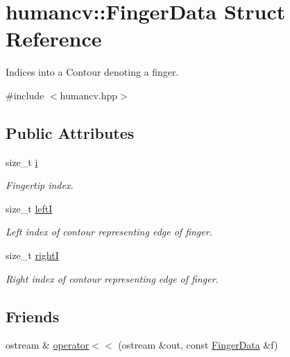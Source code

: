 \hypertarget{structhumancv_1_1_finger_data}{\section{humancv\-:\-:Finger\-Data Struct Reference}
\label{structhumancv_1_1_finger_data}
}


Indices into a {\ttfamily Contour} denoting a finger.  




{\ttfamily \#include $<$humancv.\-hpp$>$}

\subsection*{Public Attributes}
\begin{DoxyCompactItemize}
\item 
size\-\_\-t \hyperlink{structhumancv_1_1_finger_data_a5cc8c5081bfdc0ab8ffe83051fa6f966}{i}
\begin{DoxyCompactList}\small\item\em Fingertip index. \end{DoxyCompactList}\item 
size\-\_\-t \hyperlink{structhumancv_1_1_finger_data_a71ae77ff3ac0e1ebbcf635d942eaa81e}{left\-I}
\begin{DoxyCompactList}\small\item\em Left index of contour representing edge of finger. \end{DoxyCompactList}\item 
size\-\_\-t \hyperlink{structhumancv_1_1_finger_data_a00ef4dc86d46d741a289e61dcf396bb3}{right\-I}
\begin{DoxyCompactList}\small\item\em Right index of contour representing edge of finger. \end{DoxyCompactList}\end{DoxyCompactItemize}
\subsection*{Friends}
\begin{DoxyCompactItemize}
\item 
ostream \& \hyperlink{structhumancv_1_1_finger_data_a6341d1d30d8b360b043084bd59b601ea}{operator$<$$<$} (ostream \&out, const \hyperlink{structhumancv_1_1_finger_data}{Finger\-Data} \&f)
\end{DoxyCompactItemize}


